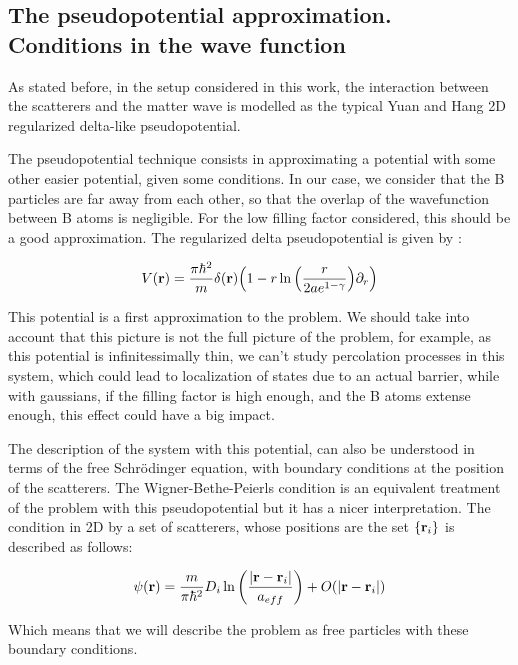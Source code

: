 \subsection{The pseudopotential approximation. Conditions in the wave function}

As stated before, in the setup considered in this work, the interaction between the scatterers and the matter wave is modelled as the typical Yuan and Hang 2D regularized delta-like pseudopotential. 

The pseudopotential technique consists in approximating a potential with some other easier potential, given some conditions. In our case, we consider that the B particles are far away from each other, so that the overlap of the wavefunction between B atoms is negligible. For the low filling factor considered, this should be a good approximation. The regularized delta pseudopotential is given by \cite{farrellSwave2010}:

\begin{equation}
    V(\mathbf{r}) = \frac{\pi\hbar^2}{m}\delta(\vb{r})\qty(1-r\ln{\qty(\frac{r}{2ae^{1-\gamma}})}\partial_{r})
\end{equation}

This potential is a first approximation to the problem. We should take into account that this picture is not the full picture of the problem, for example, as this potential is infinitessimally thin, we can't study percolation processes in this system, which could lead to localization of states due to an actual barrier, while with gaussians, if the filling factor is high enough, and the B atoms extense enough, this effect could have a big impact.

The description of the system with this potential, can also be understood in terms of the free Schrödinger equation, with boundary conditions at the position of the scatterers. The Wigner-Bethe-Peierls condition is an equivalent treatment of the problem with this pseudopotential \cite{betheQuantum1997} but it has a nicer interpretation. The condition in 2D by a set of scatterers, whose positions are the set $\{\vb{r}_i\}$ is described as follows:

\begin{equation} %
    \psi(\vb{r}) = \frac{m}{\pi\hbar ^2}D_i\ln{\qty(\frac{|\vb{r}-\vb{r}_i|}{a_{eff}})}+O(|\vb{r}-\vb{r}_i|)
\end{equation}

Which means that we will describe the problem as free particles with these boundary conditions.

